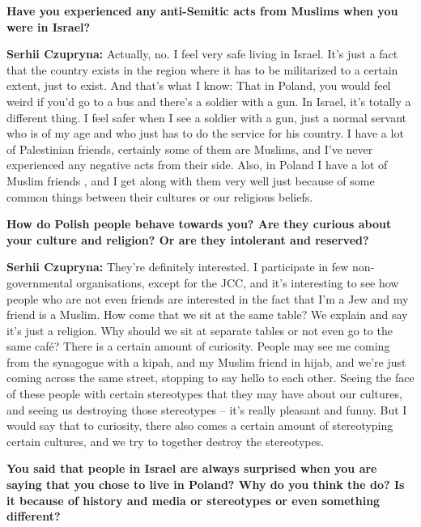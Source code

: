 \textbf{Have you experienced any anti-Semitic acts from Muslims when you were in Israel?}\par
\textbf{Serhii Czupryna:} Actually, no. I feel very safe living in Israel. It’s just a fact that the country exists in the region where it has to be militarized to a certain extent, just to exist. And that’s what I know: That in Poland, you would feel weird if you’d go to a bus and there’s a soldier with a gun. In Israel, it’s totally a different thing. I feel safer when I see a soldier with a gun, just a normal servant who is of my age and who just has to do the service for his country. I have a lot of Palestinian friends, certainly some of them are Muslims, and I’ve never experienced any negative acts from their side. Also, in Poland I have a lot of Muslim friends , and I get along with them very well just because of some common things between their cultures or our religious beliefs. \par 
\textbf{How do Polish people behave towards you? Are they curious about your culture and religion? Or are they intolerant and reserved?}\par
\textbf{Serhii Czupryna:} They’re definitely interested. I participate in few non-governmental organisations, except for the JCC, and it’s interesting to see how people who are not even friends are interested in the fact that I’m a Jew and my friend is a Muslim. How come that we sit at the same table? We explain and say it’s just a religion. Why should we sit at separate tables or not even go to the same café? There is a certain amount of curiosity. People may see me coming from the synagogue with a kipah, and my Muslim friend in hijab, and we’re just coming across the same street, stopping to say hello to each other. Seeing the face of these people with certain stereotypes that they may have about our cultures, and seeing us destroying those stereotypes – it’s really pleasant and funny. But I would say that to curiosity, there also comes a certain amount of stereotyping certain cultures, and we try to together destroy the stereotypes.\par 
\textbf{You said that people in Israel are always surprised when you are saying that you chose to live in Poland? Why do you think the do? Is it because of history and media or stereotypes or even something different?}\par
